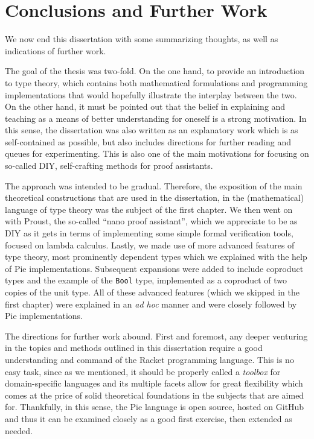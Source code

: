 
\chapter*{Conclusions and Further Work}
\pagestyle{plain}                           %

\indent\indent We now end this dissertation with some summarizing
thoughts, as well as indications of further work.

The goal of the thesis was two-fold. On the one hand, to provide an
introduction to type theory, which contains both mathematical formulations
and programming implementations that would hopefully illustrate the
interplay between the two. On the other hand, it must be pointed out that
the belief in explaining and teaching as a means of better understanding
for oneself is a strong motivation. In this sense, the dissertation
was also written as an explanatory work which is as self-contained as
possible, but also includes directions for further reading and queues
for experimenting. This is also one of the main motivations for focusing
on so-called DIY, self-crafting methods for proof assistants.

The approach was intended to be gradual. Therefore, the exposition
of the main theoretical constructions that are used in the dissertation,
in the (mathematical) language of type theory was the subject of the
first chapter. We then went on with Proust, the so-called ``nano proof
assistant'', which we appreciate to be as DIY as it gets in terms of
implementing some simple formal verification tools, focused on lambda
calculus. Lastly, we made use of more advanced features of type theory,
most prominently dependent types which we explained with the help of
Pie implementations. Subsequent expansions were added to include
coproduct types and the example of the \texttt{Bool} type, implemented
as a coproduct of two copies of the unit type. All of these advanced
features (which we skipped in the first chapter) were explained in an
\emph{ad hoc} manner and were closely followed by Pie implementations.

\vspace{0.3cm}

The directions for further work abound. First and foremost, any deeper
venturing in the topics and methods outlined in this dissertation require
a good understanding and command of the Racket programming language.
This is no easy task, since as we mentioned, it should be properly called
a \emph{toolbox} for domain-specific languages and its multiple facets
allow for great flexibility which comes at the price of solid theoretical
foundations in the subjects that are aimed for. Thankfully, in this sense,
the Pie language is open source, hosted on GitHub and thus it can be examined
closely as a good first exercise, then extended as needed.

